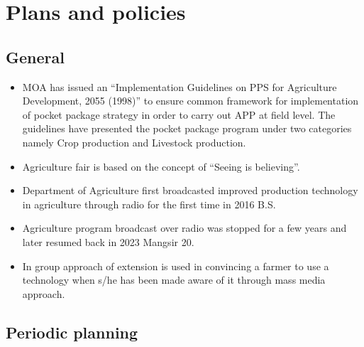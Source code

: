\documentclass[
]{book}
\providecommand{\tightlist}{%
  \setlength{\itemsep}{0pt}\setlength{\parskip}{0pt}}
\begin{document}
\hypertarget{plans-and-policies}{%
\chapter{Plans and policies}\label{plans-and-policies}}

\hypertarget{general-1}{%
\section{General}\label{general-1}}

\begin{itemize}
\tightlist
\item
  MOA has issued an ``Implementation Guidelines on PPS for Agriculture Development, 2055 (1998)'' to ensure common framework for implementation of pocket package strategy in order to carry out APP at field level. The guidelines have presented the pocket package program under two categories namely Crop production and Livestock production.
\item
  Agriculture fair is based on the concept of ``Seeing is believing''.
\item
  Department of Agriculture first broadcasted improved production technology in agriculture through radio for the first time in 2016 B.S.
\item
  Agriculture program broadcast over radio was stopped for a few years and later resumed back in 2023 Mangsir 20.
\item
  In group approach of extension is used in convincing a farmer to use a technology when s/he has been made aware of it through mass media approach.
\end{itemize}

\hypertarget{periodic-planning}{%
\section{Periodic planning}\label{periodic-planning}}
\end{document}
